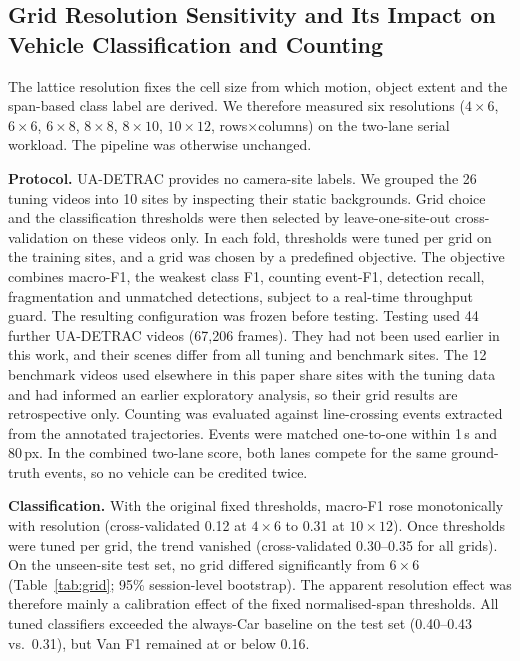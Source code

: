 \subsection{Grid Resolution Sensitivity and Its Impact on Vehicle Classification and Counting}
\label{sec:grid-sensitivity}

The lattice resolution fixes the cell size from which motion, object extent
and the span-based class label are derived. We therefore measured six
resolutions ($4{\times}6$, $6{\times}6$, $6{\times}8$, $8{\times}8$,
$8{\times}10$, $10{\times}12$, rows$\times$columns) on the two-lane serial
workload. The pipeline was otherwise unchanged.

\textbf{Protocol.} UA-DETRAC provides no camera-site labels. We grouped the 26
tuning videos into 10 sites by inspecting their static backgrounds. Grid choice
and the classification thresholds were then selected by leave-one-site-out
cross-validation on these videos only. In each fold, thresholds were tuned per
grid on the training sites, and a grid was chosen by a predefined objective. The
objective combines macro-F1, the weakest class F1, counting event-F1, detection
recall, fragmentation and unmatched detections, subject to a real-time
throughput guard. The resulting configuration was frozen before testing. Testing
used 44 further UA-DETRAC videos (67{,}206 frames). They had not been used
earlier in this work, and their scenes differ from all tuning and benchmark
sites. The 12 benchmark videos used elsewhere in this paper share sites with the
tuning data and had informed an earlier exploratory analysis, so their grid
results are retrospective only. Counting was evaluated against line-crossing
events extracted from the annotated trajectories. Events were matched one-to-one
within 1\,s and 80\,px. In the combined two-lane score, both lanes compete for
the same ground-truth events, so no vehicle can be credited twice.

\textbf{Classification.} With the original fixed thresholds, macro-F1 rose
monotonically with resolution (cross-validated 0.12 at $4{\times}6$ to 0.31 at
$10{\times}12$). Once thresholds were tuned per grid, the trend vanished
(cross-validated 0.30--0.35 for all grids). On the unseen-site test set, no
grid differed significantly from $6{\times}6$ (Table~\ref{tab:grid}; 95\%
session-level bootstrap). The apparent resolution effect was therefore mainly a
calibration effect of the fixed normalised-span thresholds. All tuned
classifiers exceeded the always-Car baseline on the test set (0.40--0.43 vs.\
0.31), but Van F1 remained at or below 0.16.

